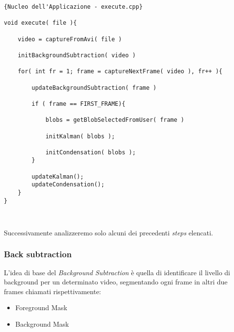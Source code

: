\lstset{language=c++}
\lstset{commentstyle=\emph}
\begin{lstlisting}[frame=r,caption=Nucleo dell'Applicazione - execute.cpp ,breaklines=true,basicstyle=\small]{Nucleo dell'Applicazione - execute.cpp}

void execute( file ){

	video = captureFromAvi( file )
	
	initBackgroundSubtraction( video )

	for( int fr = 1; frame = captureNextFrame( video ), fr++ ){
	
		updateBackgroundSubtraction( frame )
		
		if ( frame == FIRST_FRAME){
			
			blobs = getBlobSelectedFromUser( frame )
	
			initKalman( blobs );
			
			initCondensation( blobs );
		}
	
		updateKalman();
		updateCondensation();
	}
}



\end{lstlisting}

Successivamente analizzeremo solo alcuni dei precedenti \textit{steps} elencati.

\subsubsection{Back subtraction}\label{sec:bgsub}
L'idea di base del \textit{Background Subtraction}  è quella di identificare il livello di background per un determinato video, segmentando ogni frame in altri due frames chiamati rispettivamente:

\begin{itemize}
\item Foreground Mask
\item Background Mask
\end{itemize}



